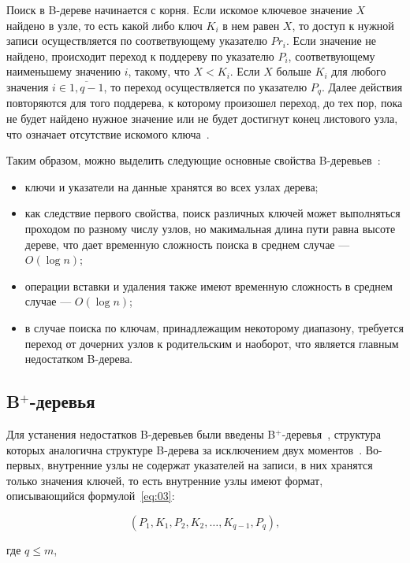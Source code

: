 Поиск в B-дереве начинается с корня. Если искомое ключевое значение $X$ найдено
в узле, то есть какой либо ключ $K_i$ в нем равен $X$, то доступ к нужной записи
осуществляется по соответвующему указателю $Pr_i$. Если значение не найдено,
происходит переход к поддереву по указателю $P_i$, соответвующему наименьшему
значению $i$, такому, что $X < K_i$. Если $X$ больше $K_i$ для любого значения
$i \in \overline{1, q - 1}$, то переход осуществляется по указателю $P_q$.
Далее действия повторяются для того поддерева, к которому произошел переход, до
тех пор, пока не будет найдено нужное значение или не будет достигнут конец
листового узла, что означает отсутствие искомого ключа~\cite{arki}.

Таким образом, можно выделить следующие основные свойства
\mbox{B-деревьев}~\cite{marvel}:
\begin{itemize}
    \item ключи и указатели на данные хранятся во всех узлах дерева;
    \item как следствие первого свойства, поиск различных ключей может
        выполняться проходом по разному числу узлов, но макимальная длина пути
        равна высоте дереве, что дает временную сложность поиска в среднем
        случае --- $O(\log n)$;
    \item операции вставки и удаления также имеют временную сложность в среднем
        случае --- $O(\log n)$;
    \item в случае поиска по ключам, принадлежащим некоторому диапазону,
        требуется переход от дочерних узлов к родительским и наоборот, что
        является главным недостатком B-дерева.
\end{itemize}

\subsection{B$^+$-деревья}

Для устанения недостатков B-деревьев были введены B$^+$-деревья~\cite{marvel},
структура которых аналогична структуре B-дерева за исключением двух
моментов~\cite{arki}.  Во-первых, внутренние узлы не содержат указателей на
записи, в них хранятся только значения ключей, то есть внутренние узлы имеют
формат, описывающийся формулой~\eqref{eq:03}:

\begin{equation}\label{eq:03}
    (P_1, K_1, P_2, K_2, \dots, K_{q-1}, P_q),
\end{equation}

где $q \leqslant m$,

